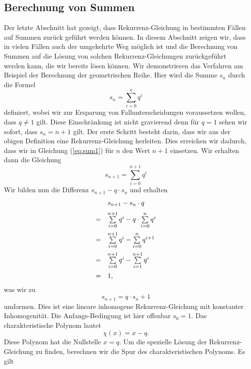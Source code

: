 \subsection{Berechnung von Summen}
Der letzte Abschnitt hat gezeigt, dass Rekurrenz-Gleichung in bestimmten F\"{a}llen auf Summen zur\"{u}ck gef\"{u}hrt
werden k\"{o}nnen.  In diesem Abschnitt zeigen wir, dass in vielen F\"{a}llen auch der umgekehrte
Weg m\"{o}glich ist und die   Berechnung von Summen auf die L\"{o}sung von solchen
Rekurrenz-Gleichungen zur\"{u}ckgef\"{u}hrt werden 
kann, die wir bereits l\"{o}sen k\"{o}nnen.  
Wir demonstrieren das Verfahren am Beispiel der Berechnung der geometrischen Reihe.  Hier wird die Summe
$s_n$ durch die Formel
\begin{equation}
  \label{eq:sum1}
  s_n = \sum\limits_{i=0}^n q^i   
\end{equation}
definiert, wobei wir zur Ersparung von Fallunterscheidungen voraussetzen wollen, dass $q \not= 1$ gilt.
Diese Einschr\"{a}nkung ist nicht gravierend denn f\"{u}r $q=1$ sehen wir sofort, dass $s_n = n+1$ gilt. Der
erste Schritt besteht darin, dass wir aus der obigen Definition eine Rekurrenz-Gleichung herleiten.
Dies erreichen wir dadurch, dass wir in Gleichung (\ref{eq:sum1}) f\"{u}r $n$ den Wert $n+1$ einsetzen.  Wir
erhalten dann die Gleichung
\begin{equation}
  \label{eq:sum2}
  s_{n+1} = \sum\limits_{i=0}^{n+1} q^i    
\end{equation}
Wir bilden nun die Differenz  $s_{n+1} - q \cdot s_n$ und erhalten
\[ 
\begin{array}[t]{cl}
    & s_{n+1} - s_n \cdot q                                            \\[0.2cm]
  = & \sum\limits_{i=0}^{n+1} q^i - q \cdot \sum\limits_{i=0}^{n} q^i  \\[0.4cm]
  = & \sum\limits_{i=0}^{n+1} q^i -  \sum\limits_{i=0}^{n} q^{i+1}     \\[0.4cm]
  = & \sum\limits_{i=0}^{n+1} q^i -  \sum\limits_{i=1}^{n+1} q^{i}     \\[0.4cm]
  = & 1, 
\end{array}
\]
was wir zu
\[ s_{n+1} = q \cdot s_n + 1 \]
umformen.  Dies ist eine lineare inhomogene Rekurrenz-Gleichung mit konstanter Inhomogenit\"{a}t. 
Die Anfangs-Bedingung ist hier offenbar $s_0 = 1$.  Das charakteristische Polynom lautet
\[ \chi(x) = x - q. \]
Diese Polynom hat die Nullstelle $x = q$.  Um die spezielle L\"{o}sung der Rekurrenz-Gleichung zu finden,
berechnen wir die Spur des charakteristischen Polynoms.  Es gilt
